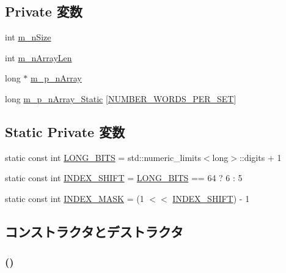 \subsection*{Private 変数}
\begin{DoxyCompactItemize}
\item 
int \hyperlink{classSet_a596ca3ad7845fc90a3bc5b0b39f8a439}{m\_\-nSize}
\item 
int \hyperlink{classSet_a195377de8b2a14cb8858ab158a80b916}{m\_\-nArrayLen}
\item 
long $\ast$ \hyperlink{classSet_a92c58ed80e0e7dade7838d3d300cc4cf}{m\_\-p\_\-nArray}
\item 
long \hyperlink{classSet_a3fef4acb279bdd97b96c6da7b042cc1e}{m\_\-p\_\-nArray\_\-Static} \mbox{[}\hyperlink{Set_8hh_aeafee2fb41f8658683a0f674ac339e3d}{NUMBER\_\-WORDS\_\-PER\_\-SET}\mbox{]}
\end{DoxyCompactItemize}
\subsection*{Static Private 変数}
\begin{DoxyCompactItemize}
\item 
static const int \hyperlink{classSet_a255499bfd2e55c748b3b35f4c0715e07}{LONG\_\-BITS} = std::numeric\_\-limits$<$long$>$::digits + 1
\item 
static const int \hyperlink{classSet_a33af0963dbe2fdf9ce5b7303c924b673}{INDEX\_\-SHIFT} = \hyperlink{classSet_a255499bfd2e55c748b3b35f4c0715e07}{LONG\_\-BITS} == 64 ? 6 : 5
\item 
static const int \hyperlink{classSet_af544f28f2a0f3d2222314eb4dbcba4e8}{INDEX\_\-MASK} = (1 $<$$<$ \hyperlink{classSet_a33af0963dbe2fdf9ce5b7303c924b673}{INDEX\_\-SHIFT}) -\/ 1
\end{DoxyCompactItemize}


\subsection{コンストラクタとデストラクタ}
\hypertarget{classSet_ad2293f668ddb9a9fc99f78a737f6e86e}{
\subsubsection[{Set}]{ ()}}
\label{classSet_ad2293f668ddb9a9fc99f78a737f6e86e}



